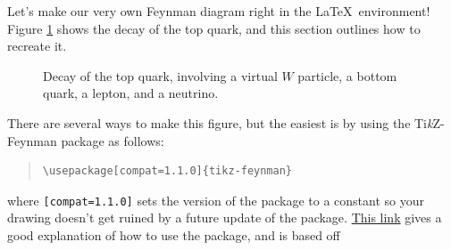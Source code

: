 \documentclass[12pt, letterpaper]{article}
\begin{document}
Let's make our very own Feynman diagram right in the \LaTeX\ environment! Figure \ref{fig:feynman} shows the decay of the top quark, and this section outlines how to recreate it.

\begin{figure}[ht!]
  \centering
  \caption{Decay of the top quark, involving a virtual $W$ particle, a bottom quark, a lepton, and a neutrino.}
  \label{fig:feynman}
\end{figure}

There are several ways to make this figure, but the easiest is by using the Ti\textit{k}Z-Feynman package as follows:

\begin{quote}
\begin{verbatim}
\usepackage[compat=1.1.0]{tikz-feynman}
\end{verbatim}
\end{quote}

where {\tt [compat=1.1.0]} sets the version of the package to a constant so your drawing doesn't get ruined by a future update of the package. \href{https://www.overleaf.com/learn/latex/feynman\_diagrams}{This link} gives a good explanation of how to use the package, and is based off \citet[]{Ellis2016}
\end{document}
